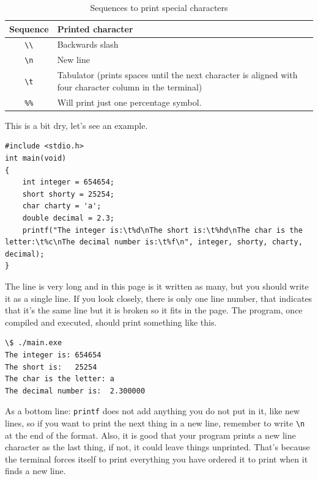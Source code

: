 \documentclass[a4paper]{article}
\begin{document}
\begin{table}[H]
\centering
\begin{tabularx}{\linewidth}{|c|Y|}
\hline
\textbf{Sequence} & \textbf{Printed character}                       \\\hline
\texttt{\textbackslash{}\textbackslash{}} & Backwards slash          \\\hline
\texttt{\textbackslash{}n}& New line                                 \\\hline
\texttt{\textbackslash{}t}& Tabulator (prints spaces until the next character is aligned with four character column in the terminal) \\\hline
\texttt{\%\%}& Will print just one percentage symbol.                \\\hline
\end{tabularx}
\caption{Sequences to print special characters}
\label{tab:specialCharsC}
\end{table}

This is a bit dry, let's see an example.

\noindent
\begin{minipage}[H]{\linewidth}
\mbox{}
\begin{lstlisting}[style=C, caption={Ejemplo de impresión.},
label={lst:decimalvsintergerDivision}]
#include <stdio.h>
int main(void)
{
    int integer = 654654;
    short shorty = 25254;
    char charty = 'a';
    double decimal = 2.3;
    printf("The integer is:\t%d\nThe short is:\t%hd\nThe char is the letter:\t%c\nThe decimal number is:\t%f\n", integer, shorty, charty, decimal);
}
\end{lstlisting}
\end{minipage}

The line is very long and in this page is it written as many, but you should
write it as a single line. If you look closely, there is only one line number,
that indicates that it's the same line but it is broken so it fits in the page.
The program, once compiled and executed, should print something like this.

\noindent
\begin{minipage}[H]{\linewidth}
\mbox{}
\begin{lstlisting}[style=terminalStyle]
\$ ./main.exe
The integer is: 654654
The short is:   25254
The char is the letter: a
The decimal number is:  2.300000
\end{lstlisting}
\end{minipage}

As a bottom line: \texttt{printf} does not add anything you do not put in it,
like new lines, so if you want to print the next thing in a new line, remember
to write \verb!\n! at the end of the format. Also, it is good that your program
prints a new line character as the last thing, if not, it could leave things
unprinted. That's because the terminal forces itself to print everything you
have ordered it to print when it finds a new line.
\end{document}
